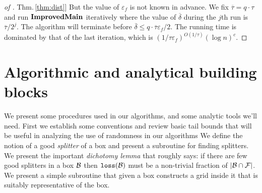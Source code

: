 \documentclass{acmsmall}
\newcommand{\cB}{{\cal B}}
\newcommand{\cF}{{\cal F}}
\newcommand{\Thm}[1]{\hyperref[thm:#1]{Thm.\,\ref*{thm:#1}}} %
\newcommand{\loss}{{\tt loss}}
\newcommand{\deltapar}{\overline{\delta}}
\newcommand{\err}{\xi}
\newcommand{\taupar}{\overline{\tau}}
\newcommand{\eps}{\varepsilon}
\newcommand{\improvedmain}{{\rm {\bf ImprovedMain}}}
\begin{document}
\begin{proof}[of \Thm{dist}]
But the value of $\eps_f$ is not known in advance. We fix $\taupar = q\cdot\tau$
and run $\improvedmain$ iteratively 
where the value of $\deltapar$ during the $j$th run is $\taupar/2^j$. 
%
The algorithm will terminate before $\deltapar \leq q\cdot\taupar\eps_f/2$.
The running time is dominated by that of the last iteration,
which is $(1/\tau \eps_f)^{O(1/\tau)}(\log n)^c$.
%
%
%
%
%
%
%
%
%
\end{proof}



\section{Algorithmic and analytical  building blocks}
\label{sec:blocks}
We present some procedures  used in  our algorithms, and some analytic tools we'll need.
First we establish some conventions and review  basic tail bounds that will be useful in analyzing the use of randomness in our algorithms
We define the notion of a good {\em splitter} of a box and present a subroutine for finding
splitters.  We present the important {\em dichotomy lemma} that roughly says: if there are few good splitters in a box $\cB$
then $\loss(\cB)$ must be a non-trivial fraction of $|\cB \cap \cF|$. 
We present a simple subroutine that given a box constructs a grid inside it that is suitably representative of the box. 
\end{document}
